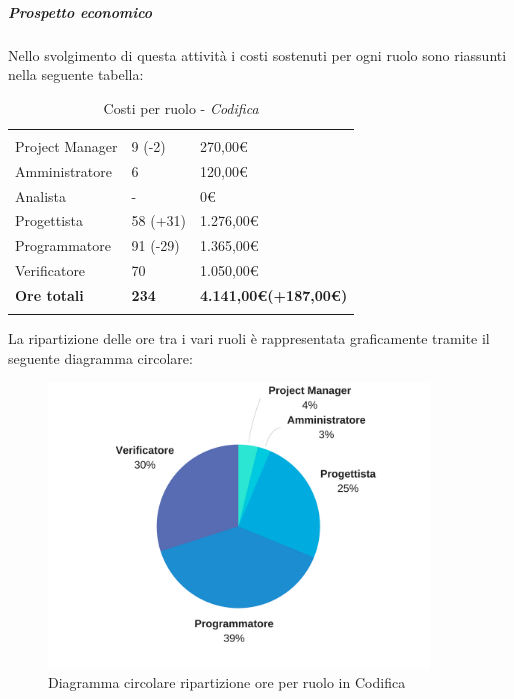 	\subparagraph{Prospetto economico} \Spazio
	Nello svolgimento di questa attività i costi sostenuti per ogni ruolo sono riassunti nella seguente tabella:
	\begin{table}[H]
		\centering
		\begin{tabular}{|p{4cm}|C{4cm}|C{4cm}|}
			
			 & &\\
			Project Manager & 9 (-2) & 270,00\euro \\
			\hline
			Amministratore& 6 & 120,00\euro \\
			\hline
			Analista & - & 0\euro \\
			\hline
			Progettista & 58 (+31) & 1.276,00\euro \\
			\hline
			Programmatore & 91 (-29) & 1.365,00\euro \\
			\hline
			Verificatore & 70 & 1.050,00\euro \\
			\hline
			\textbf{Ore totali} & \textbf{234} & \textbf{4.141,00\euro(+187,00\euro )} \\
		\end{tabular}
		\caption{Costi per ruolo - \textit{Codifica}}
	\end{table}
	
	La ripartizione delle ore tra i vari ruoli è rappresentata graficamente tramite il seguente diagramma circolare:
	
	\begin{figure}[H] 
		\centering 
		\includegraphics[width=0.9\textwidth]{images/CircolareCodificaNuova.png} 
		\caption{Diagramma circolare ripartizione ore per ruolo in Codifica}
		\label{CircolareCodifica}
	\end{figure}

